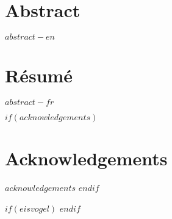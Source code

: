 
\cleardoublepage
\begin{minipage}{\linewidth}

\chapter*{Abstract}
$abstract-en$


\newpage
\chapter*{Résumé}
$abstract-fr$

\end{minipage}
\cleardoublepage



$if(acknowledgements)$
\chapter*{Acknowledgements}
$acknowledgements$
$endif$


\cleardoublepage

$if(eisvogel)$
\pagestyle{eisvogel-header-footer}
\lhead[\leftmark]{}
\rhead[]{\rightmark}
$endif$


